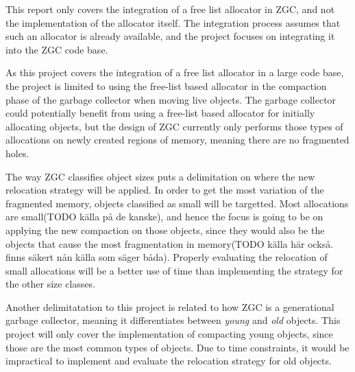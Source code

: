 This report only covers the integration of a free list allocator in ZGC, and not the implementation of the allocator itself. The integration process assumes that such an allocator is already available, and the project focuses on integrating it into the ZGC code base.

As this project covers the integration of a free list allocator in a large code base, the project is limited to using the free-list based allocator in the compaction phase of the garbage collector when moving live objects. The garbage collector could potentially benefit from using a free-list based allocator for initially allocating objects, but the design of ZGC currently only performs those types of allocations on newly created regions of memory, meaning there are no fragmented holes.

The way ZGC classifies object sizes puts a delimitation on where the new relocation strategy will be applied. In order to get the most variation of the fragmented memory, objects classified as small will be targetted. Most allocations are small(TODO källa på de kanske), and hence the focus is going to be on applying the new compaction on those objects, since they would also be the objects that cause the most fragmentation in memory(TODO källa här också. finns säkert nån källa som säger båda). Properly evaluating the relocation of small allocations will be a better use of time than implementing the strategy for the other size classes.

Another delimitatation to this project is related to how ZGC is a generational garbage collector, meaning it differentiates between \textit{young} and \textit{old} objects. This project will only cover the implementation of compacting young objects, since those are the most common types of objects. Due to time constraints, it would be impractical to implement and evaluate the relocation strategy for old objects.